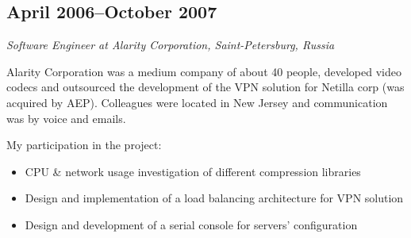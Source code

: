 \subsection*{April 2006--October 2007}

\textit{Software Engineer at Alarity Corporation, Saint-Petersburg,
Russia}

Alarity Corporation was a medium company of about 40 people, developed
video codecs and outsourced the development of the VPN solution for
Netilla corp (was acquired by AEP).  Colleagues were located in New
Jersey and communication was by voice and emails.

My participation in the project:
\begin{itemize}[noitemsep, nosep]
  \item CPU \& network usage investigation of different compression
libraries
  \item Design and implementation of a load balancing architecture for
VPN solution
  \item Design and development of a serial console for servers'
configuration
\end{itemize}
